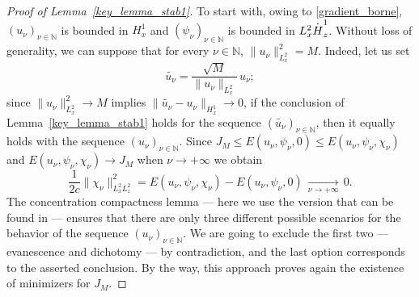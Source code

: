 \documentclass[11pt]{article}
\DeclareRobustCommand{\accentset}[2]{\overset{#1}{#2}}
\theoremstyle{definition}
\newcommand*{\overbigdot}[1]{%
\accentset{\mbox{\large\bfseries .}}{#1}}
\newenvironment{ProofOf}[1]{\begin{proof}[Proof of #1]}{\end{proof}}
\newcommand{\N}{\mathbb{N}}
\begin{document}
\begin{ProofOf}{Lemma~\ref{key_lemma_stab1}}
To start with, owing to \eqref{gradient_borne}, $(u_{\nu})_{\nu\in\mathbb N}$ is bounded in $H_{x}^{1}$ and $(\psi_{\nu})_{\nu\in\mathbb N}$ is bounded in $L_{x}^{2}\overbigdot{H}_{z}^{1}$.
Without loss of generality, we can suppose that for every $\nu\in\N$, $\|u_{\nu}\|_{L_{x}^{2}}^{2}=M$. Indeed, let us set\vspace*{-3pt}
\[
\widetilde{u_{\nu}}=\frac{\sqrt{M}}{\|u_{\nu}\|_{L_{x}^{2}}}\,u_{\nu};
\]
since $\|u_{\nu}\|_{L_{x}^{2}}^{2}\to M$ implies $\|\widetilde{u_{\nu}}-u_{\nu}\|_{H_{x}^{1}}\to 0$, if the conclusion of Lemma~\ref{key_lemma_stab1} holds for the sequence $(\widetilde{u_{\nu}})_{\nu\in \mathbb N}$, then it equally holds with the sequence $(u_{\nu})_{\nu\in \mathbb N}$.
Since $J_{M}\leq E(u_{\nu},\psi_{\nu},0)\leq E(u_{\nu},\psi_{\nu},\chi_{\nu})$ and $E(u_{\nu},\psi_{\nu},\chi_{\nu})\to J_{M}$ when $\nu\to+\infty$ we obtain\vspace*{-3pt}
\[
\frac{1}{2c}\|\chi_{\nu}\|_{L_{x}^{2}L_{z}^{2}}^{2}=E(u_{\nu},\psi_{\nu},\chi_{\nu})-E(u_{\nu},\psi_{\nu},0)\,\underset{\nu\to +\infty}{\to}\,0.
\]
The concentration compactness lemma \cite{PLLcc1, PLLcc2} --- here we use the version that can be found in \cite[Prop.\,1.7.6]{Caze} --- ensures that there are only three different possible scenarios for the behavior of the sequence $(u_{\nu})_{\nu\in\mathbb N}$.
We are going to exclude the first two --- evanescence and dichotomy --- by contradiction, and the last option corresponds to the asserted conclusion.
By the way, this approach proves again the existence of minimizers for $J_M$.


\end{ProofOf}
\end{document}
